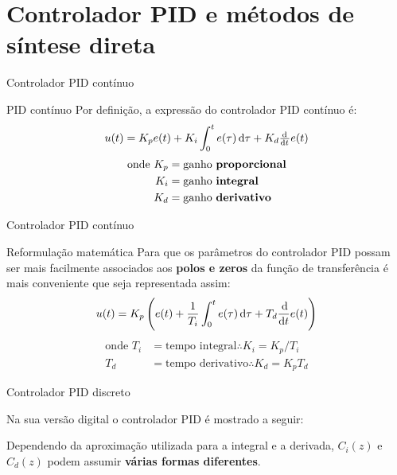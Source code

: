 \section{Controlador PID e métodos de síntese direta}

\begin{frame}{Controlador PID contínuo}
\begin{block}{PID contínuo}
	Por definição, a expressão do controlador PID contínuo é:
	\[ u(t)=K_{p}e(t)+K_i\int_{0}^{t}e(\tau)\dif\tau+K_d\od{}{t}e(t) \]
	\begin{align*}
		\text{onde }K_p&=\text{ganho \textbf{proporcional}}\\
		K_i&=\text{ganho \textbf{integral}}\\
		K_d&=\text{ganho \textbf{derivativo}}
	\end{align*}
\end{block}
\end{frame}

\begin{frame}{Controlador PID contínuo}
\begin{block}{Reformulação matemática}
	Para que os parâmetros do controlador PID possam ser mais facilmente associados aos \textbf{polos e zeros} da função de transferência é mais conveniente que seja representada assim:
	\[ u(t)=K_p\left( e(t)+\dfrac{1}{T_i}\int_{0}^{t}e(\tau)\dif \tau+T_d\dfrac{\dif}{\dif t}e(t) \right)  \]
	\begin{align*}
	\text{onde }T_i&=\text{tempo integral} \therefore K_i=K_p/T_i\\
	T_d&=\text{tempo derivativo} \therefore K_d=K_p T_d
	\end{align*}
\end{block}
\end{frame}

\begin{frame}{Controlador PID discreto}
\begin{block}{}
	Na sua versão digital o controlador PID é mostrado a seguir:
\end{block}
\centering
\scalebox{0.65}{}
\begin{block}{}
	Dependendo da aproximação utilizada para a integral e a derivada, $ C_i(z) $ e $ C_d(z) $ podem assumir \textbf{várias formas diferentes}.
\end{block}
\end{frame}

